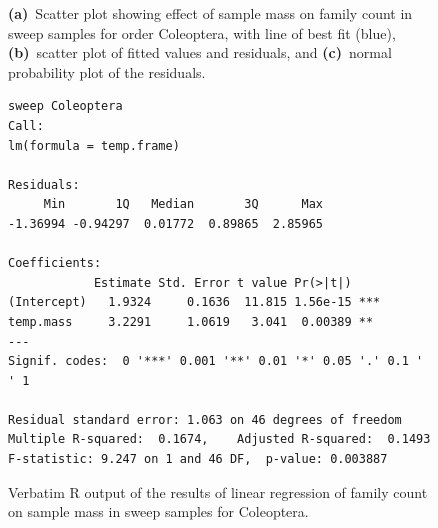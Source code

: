 \documentclass[10pt,letterpaper,twocolumn]{article}
\begin{document}
\begin{figure}[h]
\begin{subfigure}[b]{0.15\textwidth}
		\label{fig:sweep_coleoptera_qqplot}
	\end{subfigure}
	\caption{\textbf{(a)}~Scatter plot showing effect of sample mass on family count in sweep samples for order Coleoptera, with line of best fit (blue), \textbf{(b)}~scatter plot of fitted values and residuals, and \textbf{(c)}~normal probability plot of the residuals.}
	\label{fig:sweep_coleoptera}
	\smallskip
	\nointerlineskip
	\hrulefill
\end{figure}

\begin{figure}[h]
	\lstset{numbers=left}
	\lstset{xleftmargin=5mm,framexleftmargin=5mm}
	\begin{lstlisting}
sweep Coleoptera
Call:
lm(formula = temp.frame)

Residuals:
     Min       1Q   Median       3Q      Max 
-1.36994 -0.94297  0.01772  0.89865  2.85965 

Coefficients:
            Estimate Std. Error t value Pr(>|t|)    
(Intercept)   1.9324     0.1636  11.815 1.56e-15 ***
temp.mass     3.2291     1.0619   3.041  0.00389 ** 
---
Signif. codes:  0 '***' 0.001 '**' 0.01 '*' 0.05 '.' 0.1 ' ' 1

Residual standard error: 1.063 on 46 degrees of freedom
Multiple R-squared:  0.1674,	Adjusted R-squared:  0.1493 
F-statistic: 9.247 on 1 and 46 DF,  p-value: 0.003887
	\end{lstlisting}
	\caption{Verbatim R output of the results of linear regression of family count on sample mass in sweep samples for Coleoptera.}
	\label{fig:sweep_coleoptera_regression}
	\smallskip
	\nointerlineskip
	\hrulefill
\end{figure}
\end{document}
